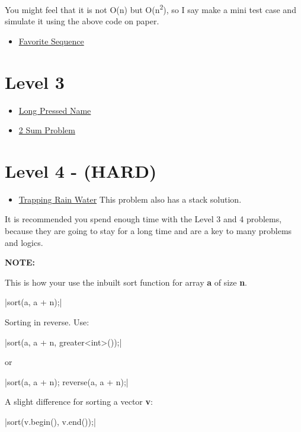 \documentclass[13pt,oneside,a4paper]{book}
\begin{document}
\bigskip

You might feel that it is not O(n) but O(n\textsuperscript{2}), so I say make a mini test case
and simulate it using the above code on paper.

\begin{itemize}
        \item \href{https://codeforces.com/problemset/problem/1462/A}{Favorite Sequence}
\end{itemize}

\section{Level 3}

\begin{itemize}
        \item \href{https://leetcode.com/problems/long-pressed-name/}{Long Pressed Name}
        \item \href{https://leetcode.com/problems/two-sum/}{2 Sum Problem}
\end{itemize}

\section{Level 4 - (HARD)}

\begin{itemize}
        \item \href{https://leetcode.com/problems/trapping-rain-water/}{Trapping Rain Water} This problem also has a stack solution.
\end{itemize}

It is recommended you spend enough time with the Level 3 and 4 problems, because they are going to stay for a long time
and are a key to many problems and logics.

\bigskip

\textbf{NOTE: }\\ 
\smallskip

This is how your use the inbuilt sort function for array \textbf{a} of size \textbf{n}.

|sort(a, a + n);|

\bigskip

Sorting in reverse.
\smallskip
Use:

|sort(a, a + n, greater<int>());|

or

|sort(a, a + n); reverse(a, a + n);|

A slight difference for sorting a vector \textbf{v}:

|sort(v.begin(), v.end());|
\end{document}
